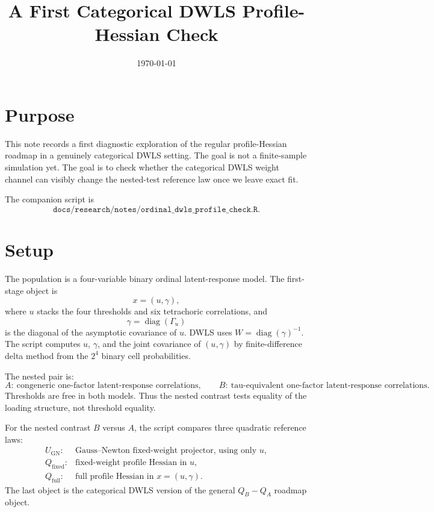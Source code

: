 \documentclass[11pt]{article}
\title{A First Categorical DWLS Profile-Hessian Check}
\author{}
\date{\today}
\begin{document}
\maketitle

\section*{Purpose}

This note records a first diagnostic exploration of the regular profile-Hessian
roadmap in a genuinely categorical DWLS setting. The goal is not a finite-sample
simulation yet. The goal is to check whether the categorical DWLS weight channel
can visibly change the nested-test reference law once we leave exact fit.

The companion script is
\[
  \texttt{docs/research/notes/ordinal\_dwls\_profile\_check.R}.
\]

\section{Setup}

The population is a four-variable binary ordinal latent-response model. The
first-stage object is
\[
  x=(u,\gamma),
\]
where $u$ stacks the four thresholds and six tetrachoric correlations, and
\[
  \gamma=\operatorname{diag}(\Gamma_u)
\]
is the diagonal of the asymptotic covariance of $u$. DWLS uses
$W=\operatorname{diag}(\gamma)^{-1}$. The script computes $u$, $\gamma$, and the
joint covariance of $(u,\gamma)$ by finite-difference delta method from the
$2^4$ binary cell probabilities.

The nested pair is:
\[
  A:\ \text{congeneric one-factor latent-response correlations},
  \qquad
  B:\ \text{tau-equivalent one-factor latent-response correlations}.
\]
Thresholds are free in both models. Thus the nested contrast tests equality of
the loading structure, not threshold equality.

For the nested contrast $B$ versus $A$, the script compares three quadratic
reference laws:
\[
\begin{array}{ll}
U_{\mathrm{GN}}:     & \text{Gauss--Newton fixed-weight projector, using only }u,\\
Q_{\mathrm{fixed}}: & \text{fixed-weight profile Hessian in }u,\\
Q_{\mathrm{full}}:  & \text{full profile Hessian in }x=(u,\gamma).
\end{array}
\]
The last object is the categorical DWLS version of the general $Q_B-Q_A$
roadmap object.
\end{document}
